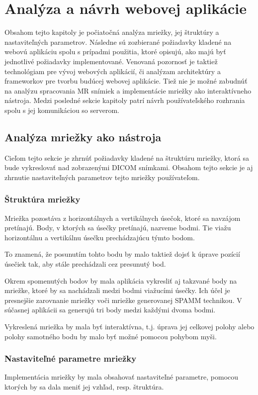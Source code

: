\chapter {Analýza a návrh webovej aplikácie}
Obsahom tejto kapitoly je počiatočná analýza mriežky, jej štruktúry a nastaviteľných parametrov. Následne sú zozbierané požiadavky kladené na webovú aplikáciu spolu s prípadmi použitia, ktoré opisujú, ako majú byť jednotlivé požiadavky implementované. Venovaná pozornosť je taktiež technológiam pre vývoj webových aplikácií, či analýzam architektúry a frameworkov pre tvorbu budúcej webovej aplikácie. Tiež nie je možné zabudnúť na analýzu spracovania MR snímiek a implementácie mriežky ako interaktívneho nástroja. Medzi posledné sekcie kapitoly patrí návrh používateľského rozhrania spolu s jej komunikáciou so serverom.

\section {Analýza mriežky ako nástroja}
Cieľom tejto sekcie je zhrnúť požiadavky kladené na štruktúru mriežky, ktorá sa bude vykreslovať nad zobrazenými DICOM snímkami. Obsahom tejto sekcie je aj zhrnutie nastaviteľných parametrov tejto mriežky používateľom.

\subsection {Štruktúra mriežky}
Mriežka pozostáva z horizontálnych a vertikálnych úsečok, ktoré sa navzájom pretínajú. Body, v ktorých sa  úsečky pretínajú, nazveme  bodmi. Tie viažu horizontálnu a vertikálnu úsečku prechádzajúcu týmto bodom.

\clearpage

To znamená, že posunutím tohto bodu by malo taktiež dojsť k úprave pozícií úsečiek tak, aby stále prechádzali cez presunutý bod.

Okrem spomenutých bodov by mala aplikácia vykresliť aj takzvané  body na mriežke, ktoré by sa nachádzali medzi bodmi viažucími úsečky. Ich účel je presnejšie zarovnanie mriežky voči mriežke generovanej SPAMM technikou. V súčasnej aplikácii sa generujú tri  body medzi každými dvoma  bodmi.

Vykreslená mriežka by mala byť interaktívna, t.j. úprava jej celkovej polohy alebo polohy samotného bodu by malo byť možné pomocou pohybom myši.

\subsection {Nastaviteľné parametre mriežky}\label{grid_settings}
Implementácia mriežky by mala obsahovať nastaviteľné parametre, pomocou ktorých by sa dala meniť jej vzhľad, resp. štruktúra.

